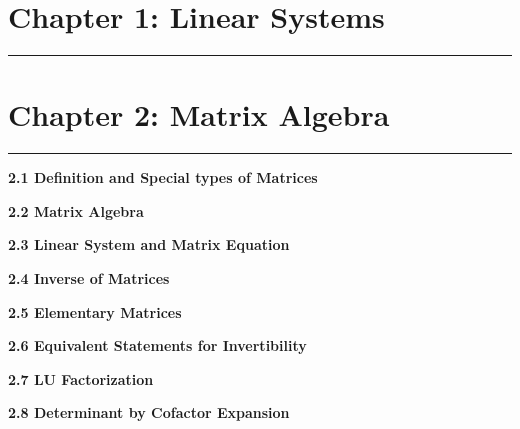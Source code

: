 \documentclass[11pt]{article}
\begin{document}
\newcommand{\defn}[1]{%
\begin{definitionBox}{}{}
#1
\end{definitionBox}%
\vspace{0.1cm}
}
\newcommand{\theo}[1]{%
\begin{theoremBox}{}{} 
#1
\end{theoremBox}%
\vspace{0.1cm}
}
\newcommand{\corr}[1]{%
\begin{corollaryBox}{}{}
#1
\end{corollaryBox}%
\vspace{0.1cm}
}
\newcommand{\algo}[2]{%
\begin{algorithmBox}{#1}{}
#2
\end{algorithmBox}%
\vspace{0.1cm}
}
\newcommand{\props}[2]{%
\begin{propertiesBox}{#1}{}
#2
\end{propertiesBox}%
\vspace{0.1cm}
}
\newcommand{\sectiontitle}[1]{%
\begin{flushleft}\large{\textbf{#1}}\end{flushleft}} 
\newcommand{\chapter}[1]{%
\newpage
\section*{#1}
\hrule
\vspace{0.3cm}
}


\chapter{Chapter 1: Linear Systems}

\chapter{Chapter 2: Matrix Algebra}

\sectiontitle{2.1 Definition and Special types of Matrices}
\sectiontitle{2.2 Matrix Algebra}
\sectiontitle{2.3 Linear System and Matrix Equation}
\sectiontitle{2.4 Inverse of Matrices}
\sectiontitle{2.5 Elementary Matrices}
\sectiontitle{2.6 Equivalent Statements for Invertibility}
\sectiontitle{2.7 LU Factorization}
\sectiontitle{2.8 Determinant by Cofactor Expansion}
\end{document}
